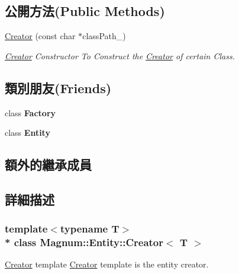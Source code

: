 \subsection*{公開方法(Public Methods)}
\begin{DoxyCompactItemize}
\item 
\hyperlink{class_magnum_1_1_entity_1_1_creator_a22135d8db7c80a2afdefb7b5d8f0ddff}{Creator} (const char $\ast$class\+Path\+\_\+)
\begin{DoxyCompactList}\small\item\em \hyperlink{class_magnum_1_1_entity_1_1_creator}{Creator} Constructor To Construct the \hyperlink{class_magnum_1_1_entity_1_1_creator}{Creator} of certain Class. \end{DoxyCompactList}\end{DoxyCompactItemize}
\subsection*{類別朋友(Friends)}
\begin{DoxyCompactItemize}
\item 
class {\bfseries Factory}\hypertarget{class_magnum_1_1_entity_1_1_creator_a328c093d609680cca505905c6d49901a}{}\label{class_magnum_1_1_entity_1_1_creator_a328c093d609680cca505905c6d49901a}

\item 
class {\bfseries Entity}\hypertarget{class_magnum_1_1_entity_1_1_creator_a614439ccac0344926adc4c0165d64060}{}\label{class_magnum_1_1_entity_1_1_creator_a614439ccac0344926adc4c0165d64060}

\end{DoxyCompactItemize}
\subsection*{額外的繼承成員}


\subsection{詳細描述}
\subsubsection*{template$<$typename T$>$\\*
class Magnum\+::\+Entity\+::\+Creator$<$ T $>$}

\hyperlink{class_magnum_1_1_entity_1_1_creator}{Creator} template \hyperlink{class_magnum_1_1_entity_1_1_creator}{Creator} template is the entity creator. 

